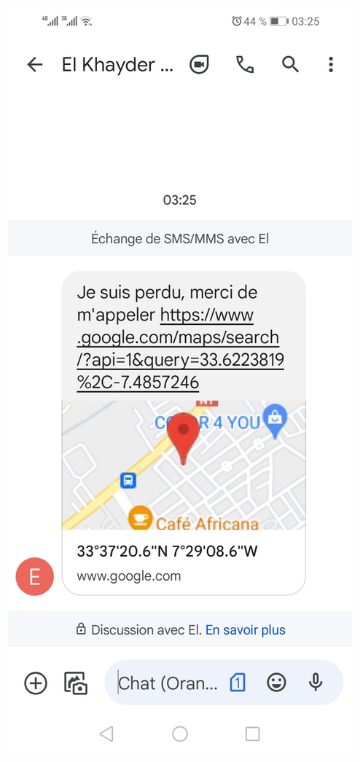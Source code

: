 \begin{figure}[!htbp]
    \centering
    \begin{subfigure}[t]{.45\linewidth}
        \centering
         \includegraphics[width=\textwidth]{assets/SMS/sms.jpg}

\end{subfigure}
\end{figure}
